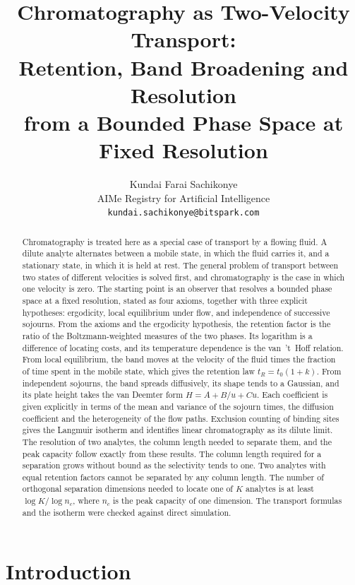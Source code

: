 \documentclass[11pt,a4paper]{article}
\title{\textbf{Chromatography as Two-Velocity Transport:\\Retention, Band Broadening and Resolution\\from a Bounded Phase Space at Fixed Resolution}}
\author{
Kundai Farai Sachikonye\\
AIMe Registry for Artificial Intelligence\\
\texttt{kundai.sachikonye@bitspark.com}
}
\date{}
\theoremstyle{definition}
\theoremstyle{remark}
\begin{document}
\maketitle

\begin{abstract}
\noindent
Chromatography is treated here as a special case of transport by a flowing fluid.
A dilute analyte alternates between a mobile state, in which the fluid carries it, and a stationary state, in which it is held at rest.
The general problem of transport between two states of different velocities is solved first, and chromatography is the case in which one velocity is zero.
The starting point is an observer that resolves a bounded phase space at a fixed resolution, stated as four axioms, together with three explicit hypotheses: ergodicity, local equilibrium under flow, and independence of successive sojourns.
From the axioms and the ergodicity hypothesis, the retention factor is the ratio of the Boltzmann-weighted measures of the two phases.
Its logarithm is a difference of locating costs, and its temperature dependence is the van~'t~Hoff relation.
From local equilibrium, the band moves at the velocity of the fluid times the fraction of time spent in the mobile state, which gives the retention law $t_R=t_0(1+k)$.
From independent sojourns, the band spreads diffusively, its shape tends to a Gaussian, and its plate height takes the van Deemter form $H=A+B/u+Cu$.
Each coefficient is given explicitly in terms of the mean and variance of the sojourn times, the diffusion coefficient and the heterogeneity of the flow paths.
Exclusion counting of binding sites gives the Langmuir isotherm and identifies linear chromatography as its dilute limit.
The resolution of two analytes, the column length needed to separate them, and the peak capacity follow exactly from these results.
The column length required for a separation grows without bound as the selectivity tends to one.
Two analytes with equal retention factors cannot be separated by any column length.
The number of orthogonal separation dimensions needed to locate one of $K$ analytes is at least $\log K/\log n_c$, where $n_c$ is the peak capacity of one dimension.
The transport formulas and the isotherm were checked against direct simulation.
\end{abstract}

\tableofcontents

\section{Introduction}
\label{sec:intro}
\end{document}
